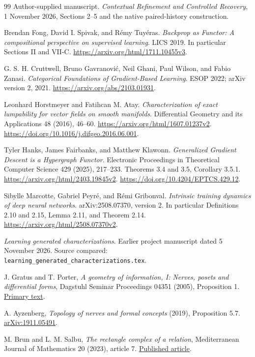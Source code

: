 \documentclass[11pt]{article}
\theoremstyle{definition}
\theoremstyle{remark}\newtheorem{remark}[theorem]{Remark}
\begin{document}
\begin{thebibliography}{99}
 Author-supplied manuscript.
\emph{Contextual Refinement and Controlled Recovery},
1 November 2026, Sections 2--5 and the native paired-history construction.

Brendan Fong, David I. Spivak, and R\'emy Tuy\'eras.
\emph{Backprop as Functor: A compositional perspective on supervised
learning}. LICS 2019. In particular Sections II and VII-C.
\url{https://arxiv.org/html/1711.10455v3}.

G. S. H. Cruttwell, Bruno Gavranovi\'c, Neil Ghani, Paul Wilson, and Fabio
Zanasi. \emph{Categorical Foundations of Gradient-Based Learning}.
ESOP 2022; arXiv version 2, 2021.
\url{https://arxiv.org/abs/2103.01931}.

Leonhard Horstmeyer and Fatihcan M. Atay.
\emph{Characterization of exact lumpability for vector fields on smooth
manifolds}. Differential Geometry and its Applications 48 (2016), 46--60.
\url{https://arxiv.org/html/1607.01237v2}.
\url{https://doi.org/10.1016/j.difgeo.2016.06.001}.

Tyler Hanks, James Fairbanks, and Matthew Klawonn.
\emph{Generalized Gradient Descent is a Hypergraph Functor}.
Electronic Proceedings in Theoretical Computer Science 429 (2025), 217--233.
Theorems 3.4 and 3.5, Corollary 3.5.1.
\url{https://arxiv.org/html/2403.19845v2}.
\url{https://doi.org/10.4204/EPTCS.429.12}.

Sibylle Marcotte, Gabriel Peyr\'e, and R\'emi Gribonval.
\emph{Intrinsic training dynamics of deep neural networks}.
arXiv:2508.07370, version 2. In particular Definitions 2.10 and 2.15,
Lemma 2.11, and Theorem 2.14.
\url{https://arxiv.org/html/2508.07370v2}.

\emph{Learning generated characterizations}.
Earlier project manuscript dated 5 November 2026.
Source compared: \nolinkurl{learning_generated_characterizations.tex}.

 J. Gratus and T. Porter,
\emph{A geometry of information, I: Nerves, posets and differential forms},
Dagstuhl Seminar Proceedings 04351 (2005), Proposition 1.
\href{https://drops.dagstuhl.de/storage/16dagstuhl-seminar-proceedings/dsp-vol04351/DagSemProc.04351.6/DagSemProc.04351.6.pdf}{Primary text}.

 A. Ayzenberg,
\emph{Topology of nerves and formal concepts} (2019), Proposition 5.7.
\href{https://arxiv.org/abs/1911.05491}{arXiv:1911.05491}.

 M. Brun and L. M. Salbu,
\emph{The rectangle complex of a relation}, Mediterranean Journal of
Mathematics 20 (2023), article 7.
\href{https://doi.org/10.1007/s00009-022-02213-0}{Published article}.


\end{thebibliography}
\end{document}
